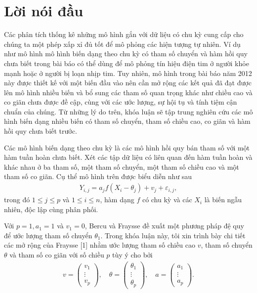 \chapter*{Lời nói đầu}

Các phân tích thống kê những mô hình gắn với dữ liệu có chu kỳ cung cấp cho chúng ta một phép xấp xỉ đủ tốt để mô phỏng các hiện tượng tự nhiên. Ví dụ như mô hình mô hình biến dạng theo chu kỳ có tham số chuyển và hàm hồi quy chưa biết trong bài báo \cite{bercu} có thể dùng để mô phỏng tín hiệu điện tim ở người khỏe mạnh hoặc ở người bị loạn nhịp tim. Tuy nhiên, mô hình trong bài báo năm 2012 này được thiết kế với một biến đầu vào nên cần mở rộng các kết quả đã đạt được lên mô hình nhiều biến và bổ sung các tham số quan trọng khác như chiều cao và co giãn chưa được đề cập, cùng với các ước lượng, sự hội tụ và tính tiệm cận chuẩn của chúng. Từ những lý do trên, khóa luận sẽ tập trung nghiên cứu các mô hình biến dạng nhiều biến có tham số chuyển, tham số chiều cao, co giãn và hàm hồi quy chưa biết trước.

Các mô hình biến dạng theo chu kỳ là các mô hình hồi quy bán tham số với một hàm tuần hoàn chưa biết. Xét các tập dữ liệu có liên quan đến hàm tuần hoàn và khác nhau ở ba tham số, một tham số chuyển, một tham số chiều cao và một tham số co giãn. Cụ thể mô hình trên được biểu diễn như sau
\begin{align}
    Y_{i, j}=a_{j} f\left(X_{i}-\theta_{j}\right)+v_{j}+\varepsilon_{i, j},
    \label{1.1}
\end{align}
trong đó $1 \leq j \leq p$ và $1 \leq i \leq n$, hàm dạng $f$ có chu kỳ và các $X_{i}$ là biến ngẫu nhiên, độc lập cùng phân phối.

Với $p=1, a_{1}=1$ và $v_{1}=0$, Bercu và Fraysse \cite{bercu} đề xuất một phương pháp đệ quy để ước lượng tham số chuyển $\theta_{1}$. Trong khóa luận này, tôi xin trình bày chi tiết các mở rộng của Fraysse [1] nhằm ước lượng tham số chiều cao $v$, tham số chuyển $\theta$ và tham số co giãn với số chiều $p$ tùy ý cho bởi
\begin{align}
    v=\left(\begin{array}{c}
v_{1} \\
\vdots \\
v_{p}
\end{array}\right), \quad \theta=\left(\begin{array}{c}
\theta_{1} \\
\vdots \\
\theta_{p}
\end{array}\right), \quad a=\left(\begin{array}{c}
a_{1} \\
\vdots \\
a_{p}
\end{array}\right).
\label{1.2}
\end{align}

